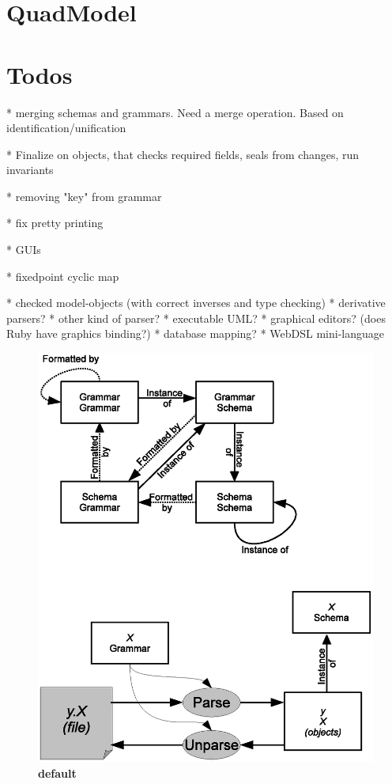 \documentclass[11pt]{article}
\begin{document}
\section{QuadModel}

\section{Todos}

* merging schemas and grammars. Need a merge operation. Based on identification/unification

* Finalize on objects, that checks required fields, seals from changes, run invariants
   
* removing "key" from grammar

* fix pretty printing 

* GUIs

* fixedpoint cyclic map





* checked model-objects (with correct inverses and type checking)
* derivative parsers?
* other kind of parser?
* executable UML?
* graphical editors?
    (does Ruby have graphics binding?)
* database mapping?
* WebDSL mini-language




\begin{figure}[htbp]
\begin{center}
\includegraphics[scale=0.8]{QuadModel.eps}
\caption{{\bf default}}
\label{default}
\end{center}
\end{figure}
\end{document}
